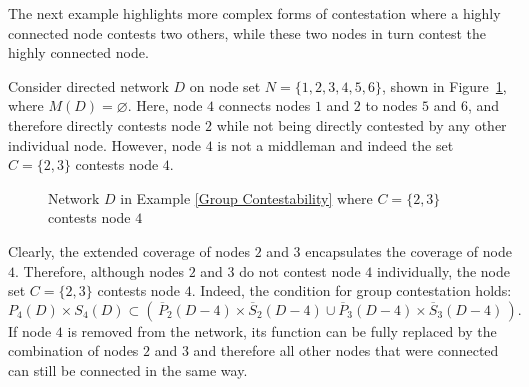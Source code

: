\noindent
The next example highlights more complex forms of contestation where a highly connected node contests two others, while these two nodes in turn contest the highly connected node.

\begin{example} \label{Group Contestability}
Consider directed network $D$ on node set $N = \{1,2,3,4,5,6\}$, shown in Figure~\ref{Complex Contestability}, where $M(D) = \varnothing$. Here, node $4$ connects nodes $1$ and $2$ to nodes $5$ and $6$, and therefore directly contests node $2$ while not being directly contested by any other individual node. However, node $4$ is not a middleman and indeed the set $ C= \{ 2,3 \}$ contests node $4$.

\begin{figure}[h]
\begin{center}
\caption{Network $D$ in Example \ref{Group Contestability} where $C = \{ 2,3 \}$ contests node $4$}
\label{Complex Contestability}
\end{center}
\end{figure}

\noindent
Clearly, the extended coverage of nodes $2$ and $3$ encapsulates the coverage of node $4$. Therefore, although nodes $2$ and $3$ do not contest node $4$ individually, the node set $C = \{ 2,3 \}$ contests node $4$. Indeed, the condition for group contestation holds:
\begin{equation}
P_{4}(D) \times S_{4}(D) \subset \left( \, \overline{P}_{2}(D - 4) \times \overline{S}_{2}(D - 4) \cup \overline{P}_{3}(D - 4) \times \overline{S}_{3}(D - 4) \, \right).
\end{equation}
If node $4$ is removed from the network, its function can be fully replaced by the combination of nodes $2$ and $3$ and therefore all other nodes that were connected can still be connected in the same way.
\end{example}

